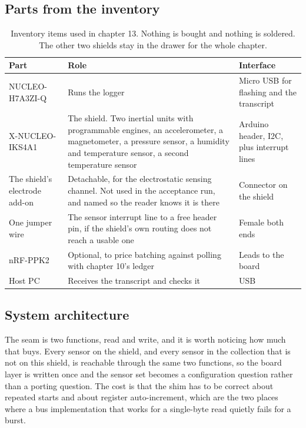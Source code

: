 \subsection*{Parts from the inventory}

\begin{table}[H]\centering\small
\begin{tabular}{p{40mm}p{66mm}p{40mm}}
\toprule
Part & Role & Interface \\
\midrule
NUCLEO-H7A3ZI-Q & Runs the logger & Micro USB for flashing and the transcript \\
X-NUCLEO-IKS4A1 & The shield. Two inertial units with programmable engines, an accelerometer, a magnetometer, a pressure sensor, a humidity and temperature sensor, a second temperature sensor & Arduino header, I2C, plus interrupt lines \\
The shield's electrode add-on & Detachable, for the electrostatic sensing channel. Not used in the acceptance run, and named so the reader knows it is there & Connector on the shield \\
One jumper wire & The sensor interrupt line to a free header pin, if the shield's own routing does not reach a usable one & Female both ends \\
nRF-PPK2 & Optional, to price batching against polling with chapter 10's ledger & Leads to the board \\
Host PC & Receives the transcript and checks it & USB \\
\bottomrule
\end{tabular}
\caption{Inventory items used in chapter 13. Nothing is bought and nothing is soldered. The other two shields stay in the drawer for the whole chapter.}
\end{table}

\subsection*{System architecture}


The seam is two functions, read and write, and it is worth noticing how much
that buys. Every sensor on the shield, and every sensor in the collection that
is not on this shield, is reachable through the same two functions, so the
board layer is written once and the sensor set becomes a configuration question
rather than a porting question. The cost is that the shim has to be correct
about repeated starts and about register auto-increment, which are the two
places where a bus implementation that works for a single-byte read quietly
fails for a burst.

